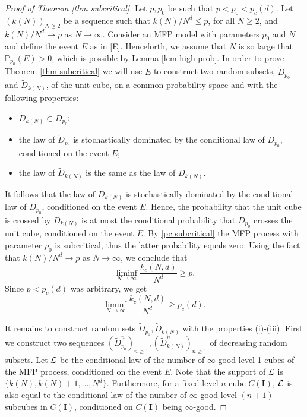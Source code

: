 \documentclass[11pt,a4paper]{article}
\newcommand{\Ib}{\ensuremath{\mathbf{I}}}
\newcommand{\pc}{\ensuremath{p_{c}(d)}}
\newcommand{\IP}{\ensuremath{\mathbb{P}}}
\theoremstyle{remark}
\begin{document}
\begin{proof}[Proof of Theorem \ref{thm subcritical}]
Let $p,p_0$ be such that $p < p_0 < \pc$. Let $(k(N))_{N \geq 2}$ be a sequence such that $k(N)/N^d \leq p$, for all $N \geq 2$, and $k(N)/N^d \to p$ as $N \to \infty$. Consider an MFP model with parameters $p_0$ and $N$ and define the event $E$ as in \eqref{E}. Henceforth, we assume that $N$ is so large that $\IP_{p_0}(E)>0$, which is possible by Lemma \ref{lem high prob}. In order to prove Theorem \ref{thm subcritical} we will use $E$ to construct two random subsets, $\tilde{D}_{p_{0}}$ and $\tilde{D}_{k(N)}$, of the unit cube, on a common probability space and with the following properties: 
\begin{itemize}
 \item[(i)] $\tilde{D}_{k(N)} \subset \tilde{D}_{p_{0}}$;
\item[(ii)] the law of $\tilde{D}_{p_{0}}$ is stochastically dominated by the conditional law of $D_{p_{0}}$, conditioned on the event $E$;
\item[(iii)] the law of $\tilde D_{k(N)}$ is the same as the law of $D_{k(N)}$.
\end{itemize}


It follows that the law of $D_{k(N)}$ is stochastically dominated by the conditional law of $D_{p_0}$, 
conditioned on the event $E$. Hence, the probability that the unit cube is crossed by $D_{k(N)}$ is at most the conditional probability that $D_{p_0}$ crosses the unit cube, conditioned on the event $E$. By \eqref{pc subcritical} the MFP process with parameter $p_0$ is subcritical, thus the latter probability equals zero. Using the fact that $k(N)/N^d \to p$ as $N \to \infty$, we conclude that
\[
 \liminf_{N \to \infty} \frac{k_{c}(N,d)}{N^{d}} \geq p.
\]
Since $p<\pc$ was arbitrary, we get
\[
 \liminf_{N \to \infty} \frac{k_{c}(N,d)}{N^{d}} \geq \pc.
\]
 

It remains to construct random sets $\tilde{D}_{p_{0}},\tilde{D}_{k(N)}$ with the properties (i)-(iii). First we construct two sequences $(\tilde{D}_{p_{0}}^n)_{n\geq 1}, (\tilde{D}_{k(N)}^n)_{n\geq 1}$ of decreasing random subsets.
Let ${\cal L}$ be the conditional law of the number of $\infty$-good level-1 cubes of the MFP process, conditioned on the event $E$. Note that the support of ${\cal L}$ is $\{k(N),k(N)+1,\ldots,N^d\}$. Furthermore, for a fixed level-$n$ cube $C(\Ib)$, ${\cal L}$ is also equal to the conditional law of the number of $\infty$-good level-$(n+1)$ subcubes in $C(\Ib)$, conditioned on $C(\Ib)$ being $\infty$-good. 


\end{proof}
\end{document}
